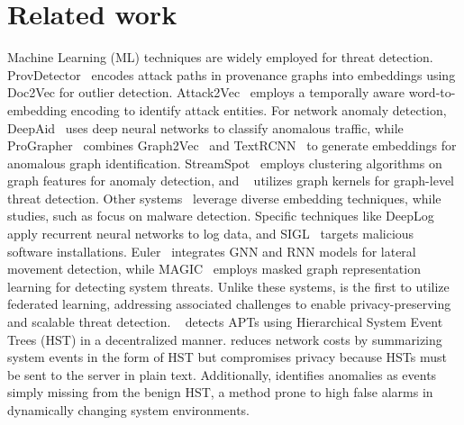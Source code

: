 \section{Related work}
\label{s:relwk}






 Machine Learning (ML) techniques are widely employed for threat detection. ProvDetector~\cite{provdetector2020} encodes attack paths in provenance graphs into embeddings using Doc2Vec\cite{le2014distributed} for outlier detection. Attack2Vec~\cite{shen2019attack2vec} employs a temporally aware word-to-embedding encoding to identify attack entities. For network anomaly detection, DeepAid~\cite{deepaid} uses deep neural networks to classify anomalous traffic, while ProGrapher~\cite{yangprographer} combines Graph2Vec~\cite{narayanan2017graph2vec} and TextRCNN~\cite{lai2015recurrent} to generate embeddings for anomalous graph identification. StreamSpot~\cite{streamspot} employs clustering algorithms on graph features for anomaly detection, and \unicorn~\cite{han2020unicorn} utilizes graph kernels for graph-level threat detection. Other systems~\cite{aljawarneh2018anomaly, maseer2021benchmarking, gyanchandani2012taxonomy, atlas} leverage diverse embedding techniques, while studies, such as \cite{zolkipli2011approach, chakkaravarthy2019survey, isohara2011kernel} focus on malware detection. Specific techniques like DeepLog~\cite{deeplog2017} apply recurrent neural networks to log data, and SIGL~\cite{sigl} targets malicious software installations. Euler~\cite{king2022euler} integrates GNN and RNN models for lateral movement detection, while MAGIC~\cite{jia2023magic} employs masked graph representation learning for detecting system threats. Unlike these systems, \Sys is the first to utilize federated learning, addressing associated challenges to enable privacy-preserving and scalable threat detection. \disdet~\cite{dong2023distdet} detects APTs using Hierarchical System Event Trees (HST) in a decentralized manner. \disdet reduces network costs by summarizing system events in the form of HST but compromises privacy because HSTs must be sent to the server in plain text. Additionally, \disdet identifies anomalies as events simply missing from the benign HST, a method prone to high false alarms in dynamically changing system environments.


